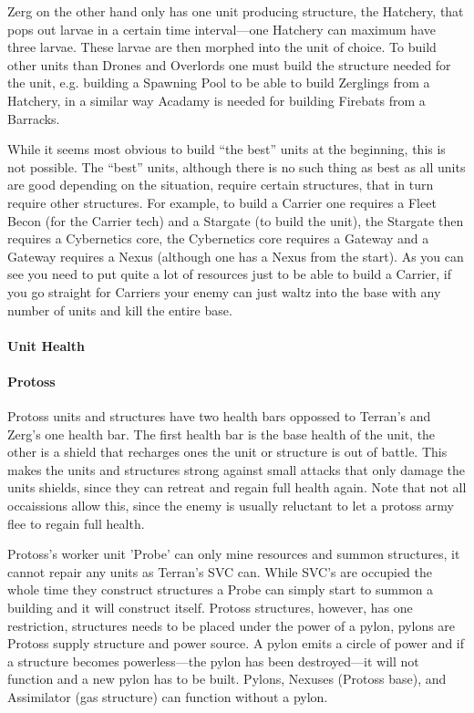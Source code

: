 Zerg on the other hand only has one unit producing structure, the Hatchery, that pops out larvae in a certain time interval—one Hatchery can maximum have three larvae. These larvae are then morphed into the unit of choice. To build other units than Drones and Overlords one must build the structure needed for the unit, e.g. building a Spawning Pool to be able to build Zerglings from a Hatchery, in a similar way Acadamy is needed for building Firebats from a Barracks.

While it seems most obvious to build “the best” units at the beginning, this is not possible. The “best” units, although there is no such thing as best as all units are good depending on the situation, require certain structures, that in turn require other structures. For example, to build a Carrier one requires a Fleet Becon (for the Carrier tech) and a Stargate (to build the unit), the Stargate then requires a Cybernetics core, the Cybernetics core requires a Gateway and a Gateway requires a Nexus (although one has a Nexus from the start). As you can see you need to put quite a lot of resources just to be able to build a Carrier, if you go straight for Carriers your enemy can just waltz into the base with any number of units and kill the entire base.

\paragraph{Unit Health}


\paragraph{Protoss}
Protoss units and structures have two health bars oppossed to Terran's and Zerg's one health bar. The first health bar is the base health of the unit, the other is a shield that recharges ones the unit or structure is out of battle. This makes the units and structures strong against small attacks that only damage the units shields, since they can retreat and regain full health again. Note that not all occaissions allow this, since the enemy is usually reluctant to let a protoss army flee to regain full health.

Protoss's worker unit 'Probe' can only mine resources and summon structures, it cannot repair any units as Terran's SVC can. While SVC's are occupied the whole time they construct structures a Probe can simply start to summon a building and it will construct itself. Protoss structures, however, has one restriction, structures needs to be placed under the power of a pylon, pylons are Protoss supply structure and power source. A pylon emits a circle of power and if a structure becomes powerless—the pylon has been destroyed—it will not function and a new pylon has to be built. Pylons, Nexuses (Protoss base), and Assimilator (gas structure) can function without a pylon.

